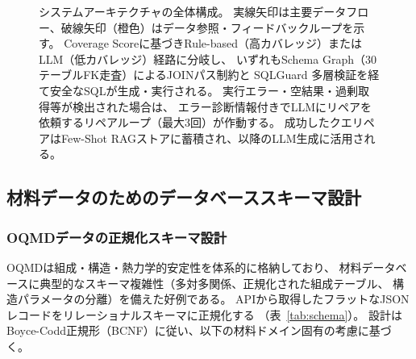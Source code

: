 \documentclass[5p,twocolumn]{elsarticle}
\begin{document}
\begin{figure}[htbp]
{%
}%
\caption{システムアーキテクチャの全体構成。
  実線矢印は主要データフロー、破線矢印（橙色）はデータ参照・フィードバックループを示す。
  Coverage Scoreに基づきRule-based（高カバレッジ）またはLLM（低カバレッジ）経路に分岐し、
  いずれもSchema Graph（30テーブルFK走査）によるJOINパス制約と
  SQLGuard 多層検証を経て安全なSQLが生成・実行される。
  実行エラー・空結果・過剰取得等が検出された場合は、
  エラー診断情報付きでLLMにリペアを依頼するリペアループ（最大3回）が作動する。
  成功したクエリペアはFew-Shot RAGストアに蓄積され、以降のLLM生成に活用される。}
\label{fig:architecture}
\end{figure}

\subsection{材料データのためのデータベーススキーマ設計}
\label{sec:schema_design}

\subsubsection{OQMDデータの正規化スキーマ設計}

OQMDは組成・構造・熱力学的安定性を体系的に格納しており、
材料データベースに典型的なスキーマ複雑性（多対多関係、正規化された組成テーブル、
構造パラメータの分離）を備えた好例である。
APIから取得したフラットなJSONレコードをリレーショナルスキーマに正規化する
（表~\ref{tab:schema}）。
設計はBoyce-Codd正規形（BCNF）に従い、以下の材料ドメイン固有の考慮に基づく。
\end{document}
